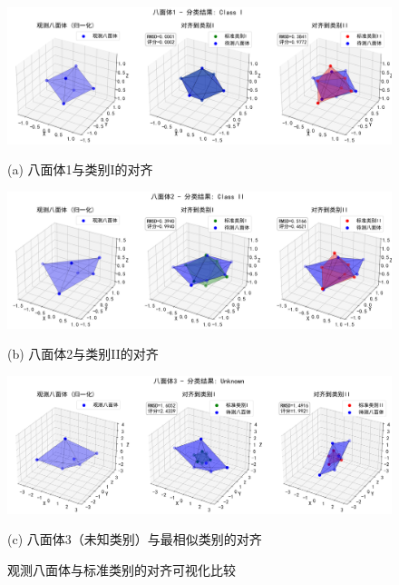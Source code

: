     \begin{figure}[H]
        \centering
\begin{minipage}{\textwidth}
    \centering
    \includegraphics[width=1\textwidth]{figures2/observed_samples_classification/八面体1_alignment.png}
    \caption*{(a) 八面体1与类别I的对齐}
\end{minipage}

\begin{minipage}{\textwidth}
    \centering
    \includegraphics[width=1\textwidth]{figures2/observed_samples_classification/八面体2_alignment.png}
    \caption*{(b) 八面体2与类别II的对齐}
\end{minipage}

\begin{minipage}{\textwidth}
        \centering
    \includegraphics[width=1\textwidth]{figures2/observed_samples_classification/八面体3_alignment.png}
    \caption*{(c) 八面体3（未知类别）与最相似类别的对齐}
\end{minipage}
\caption{观测八面体与标准类别的对齐可视化比较}
\label{fig:octahedron_alignment_comparison}
    \end{figure}
    
